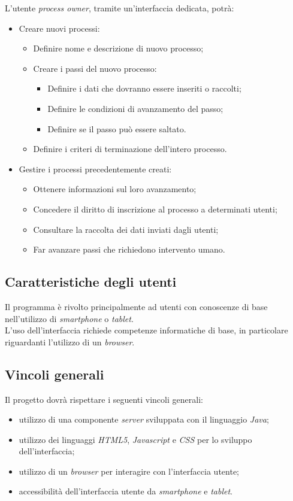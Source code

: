 L'utente \textit{process owner}, tramite un'interfaccia dedicata, potrà:

\begin{itemize}
\item Creare nuovi processi:
\begin{itemize}
\item Definire nome e descrizione di nuovo processo;
\item Creare i passi del nuovo processo:
\begin{itemize}
\item Definire i dati che dovranno essere inseriti o raccolti;
\item Definire le condizioni di avanzamento del passo;
\item Definire se il passo può essere saltato.
\end{itemize}
\item Definire i criteri di terminazione dell'intero processo.
\end{itemize}
\item Gestire i processi precedentemente creati:
\begin{itemize}
\item Ottenere informazioni sul loro avanzamento;
\item Concedere il diritto di inscrizione al processo a determinati utenti;
\item Consultare la raccolta dei dati inviati dagli utenti;
\item Far avanzare passi che richiedono intervento umano.
\end{itemize}
\end{itemize}

\subsection{Caratteristiche degli utenti}
Il programma è rivolto principalmente ad utenti con conoscenze di base nell'utilizzo di \textit{smartphone} o \textit{tablet}.\\
L'uso dell'interfaccia richiede competenze informatiche di base, in particolare riguardanti l'utilizzo di un \textit{browser}.

\subsection{Vincoli generali}
Il progetto dovrà rispettare i seguenti vincoli generali:
\begin{itemize}
\item utilizzo di una componente \textit{server} sviluppata con il linguaggio \textit{Java};
\item utilizzo dei linguaggi \textit{HTML5}, \textit{Javascript} e \textit{CSS} per lo sviluppo dell'interfaccia;
\item utilizzo di un \textit{browser} per interagire con l'interfaccia utente;
\item accessibilità dell'interfaccia utente da \textit{smartphone} e \textit{tablet}.
\end{itemize}